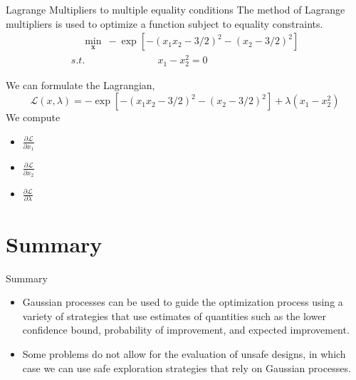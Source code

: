 \documentclass{beamer}
\begin{document}
\begin{frame}{Lagrange Multipliers to multiple equality conditions}
The method of Lagrange multipliers is used to optimize a function subject to equality
constraints. 
\begin{gather*}
    ~~~~~ \underset{\boldsymbol{x}}{\min} ~ -\exp[-(x_1x_2-3/2)^2 - (x_2-3/2)^2] \\
    {s.t.}~~~~~~~~~~~~~~~~~~~~~~~~~~~~~~~~~ x_1 - x_2^2 = 0 
\end{gather*}

We can formulate the Lagrangian, 
\begin{equation*}
    \mathcal{L}(x, \lambda) = -\exp[-(x_1x_2-3/2)^2 - (x_2-3/2)^2] + \lambda(x_1 - x_2^2)
\end{equation*}
We compute
\begin{itemize}
    \item $\frac{\partial \mathcal{L}}{\partial x_1}$
    \item $\frac{\partial \mathcal{L}}{\partial x_2}$
    \item $\frac{\partial \mathcal{L}}{\partial \lambda}$
\end{itemize}

\end{frame}

\section{Summary}
\begin{frame}{Summary}
    \begin{itemize}
        \item Gaussian processes can be used to guide the optimization process using a variety of strategies that use estimates of quantities such as the lower confidence bound, probability of improvement, and expected improvement.
        \item Some problems do not allow for the evaluation of unsafe designs, in which case we can use safe exploration strategies that rely on Gaussian processes.
    \end{itemize}
\end{frame}
\end{document}
